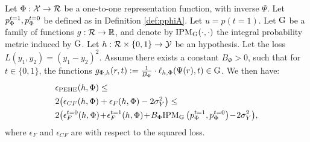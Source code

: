 \begin{thmappthm}\label{thm:indtausqloss}
Let $\Phi : \mathcal X \rightarrow \mathcal{R}$ be a one-to-one representation function, with inverse $\Psi$. Let $p^{t=1}_\Phi, p^{t=0}_\Phi$ be defined as in Definition \ref{def:pphiA}. Let $u = p(t=1)$. Let $\mathrm{G}$ be a family of functions $g:\mathcal{R} \rightarrow \mathbb{R}$, and denote by $\text{IPM}_{\mathrm{G}}(\cdot, \cdot)$ the integral probability metric induced by $\mathrm{G}$.  Let $h : \mathcal{R} \times \{0,1\} \rightarrow \mathcal Y$ be an hypothesis. Let the loss $L(y_1,y_2) = (y_1 - y_2)^2$.  Assume there exists a constant $B_\Phi>0$, such that for $t \in \{0,1\}$, the functions $g_{\Phi,h}(r,t) := \frac{1}{B_\Phi} \cdot  \ell_{h,\Phi}(\Psi(r),t) \in \mathrm{G}$.
We then have:
\begin{align*}
&\epehe(h,\Phi) \leq  \nonumber \\
& 2\!\left(\epsilon_{CF}(h,\Phi) + \epsilon_F(h,\Phi) - 2\sigma^2_Y \right) \leq  \nonumber \\
&2\!\left(\epsilon_F^{t=0}(h,\Phi)\! +\!\epsilon_F^{t=1}(h,\Phi)\!+ \! B_\Phi  \text{IPM}_\cF \left( \pt_\Phi, \pc_\Phi \right)\! -\! 2\sigma^2_Y\right)\!,
\end{align*}
where $\epsilon_F$ and $\epsilon_{CF}$ are with respect to the squared loss.
\end{thmappthm}

